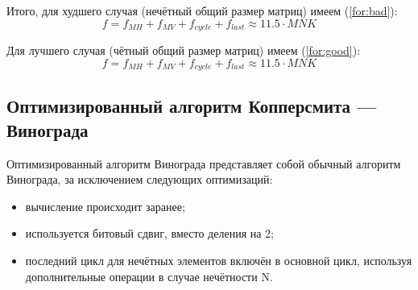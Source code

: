 \documentclass[a4paper,14pt, unknownkeysallowed]{extreport}
\begin{document}
Итого, для худшего случая (нечётный общий размер матриц) имеем (\ref{for:bad}):
\begin{equation}
	\label{for:bad}
	f =  f_{MH} + f_{MV} + f_{cycle} + f_{last}\approx 11.5 \cdot MNK
\end{equation}

Для лучшего случая (чётный общий размер матриц) имеем (\ref{for:good}):
\begin{equation}
	\label{for:good}
f =  f_{MH} + f_{MV} + f_{cycle} + f_{last} \approx 11.5 \cdot MNK
\end{equation}


\subsection{Оптимизированный алгоритм Копперсмита — Винограда}

Оптимизированный алгоритм Винограда представляет собой обычный алгоритм Винограда, за исключением следующих оптимизаций:
\begin{itemize}
	\item вычисление происходит заранее;
	\item используется битовый сдвиг, вместо деления на 2;
	\item последний цикл для нечётных элементов включён в основной цикл,
	используя дополнительные операции в случае нечётности N.
\end{itemize}
\end{document}
